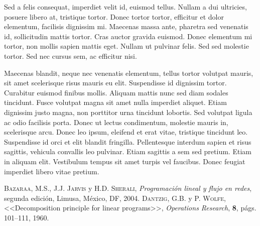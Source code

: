 \documentclass[a4paper, twoside]{article}
\begin{document}
Sed a felis consequat, imperdiet velit id, euismod tellus. Nullam a dui ultricies, posuere libero at, tristique tortor. Donec tortor tortor, efficitur et dolor elementum, facilisis dignissim mi. Maecenas massa ante, pharetra sed venenatis id, sollicitudin mattis tortor. Cras auctor gravida euismod. Donec elementum mi tortor, non mollis sapien mattis eget. Nullam ut pulvinar felis. Sed sed molestie tortor. Sed nec cursus sem, ac efficitur nisi.

Maecenas blandit, neque nec venenatis elementum, tellus tortor volutpat mauris, sit amet scelerisque risus mauris eu elit. Suspendisse id dignissim tortor. Curabitur euismod finibus mollis. Aliquam mattis nunc sed diam sodales tincidunt. Fusce volutpat magna sit amet nulla imperdiet aliquet. Etiam dignissim justo magna, non porttitor urna tincidunt lobortis. Sed volutpat ligula ac odio facilisis porta. Donec ut lectus condimentum, molestie mauris in, scelerisque arcu. Donec leo ipsum, eleifend et erat vitae, tristique tincidunt leo. Suspendisse id orci et elit blandit fringilla. Pellentesque interdum sapien et risus sagittis, vehicula convallis leo pulvinar. Etiam sagittis a sem sed pretium. Etiam in aliquam elit. Vestibulum tempus sit amet turpis vel faucibus. Donec feugiat imperdiet libero vitae pretium. 

\newpage
\newcommand{\bibliographyname}{Bibliografía} %
\addcontentsline{toc}{section}{\bibliographyname} %
\renewcommand\refname{\bibliographyname} %
\begin{thebibliography}{X}
	 \textsc{Bazaraa, M.S., J.J. Jarvis} y \textsc{H.D. Sherali}, \textit{Programación lineal y flujo en redes}, segunda edición, Limusa, México, DF, 2004.
	 \textsc{Dantzig, G.B.} y \textsc{P. Wolfe}, <<Decomposition principle for linear programs>>, \textit{Operations Research}, \textbf{8}, págs. 101--111, 1960.
\end{thebibliography}

\makeseccioncolaboradores %

\makehistorial
\end{document}
